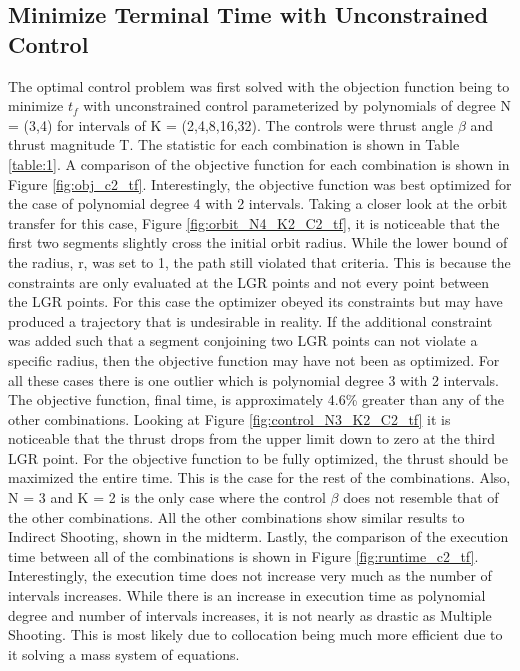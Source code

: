 \documentclass[]{article}
\begin{document}
    \subsection{Minimize Terminal Time with Unconstrained Control}
	 The optimal control problem was first solved with the objection function being to minimize \(t_f\) with unconstrained control parameterized by polynomials of degree N = (3,4) for intervals of K = (2,4,8,16,32). The controls were thrust angle \(\beta\) and thrust magnitude T. The statistic for each combination is shown in Table \ref{table:1}. A comparison of the objective function for each combination is shown in Figure \ref{fig:obj_c2_tf}. Interestingly, the objective function was best optimized for the case of polynomial degree 4 with 2 intervals. Taking a closer look at the orbit transfer for this case, Figure \ref{fig:orbit_N4_K2_C2_tf}, it is noticeable that the first two segments slightly cross the initial orbit radius. While the lower bound of the radius, r, was set to 1, the path still violated that criteria. This is because the constraints are only evaluated at the LGR points and not every point between the LGR points. For this case the optimizer obeyed its constraints but may have produced a trajectory that is undesirable in reality. If the additional constraint was added such that a segment conjoining two LGR points can not violate a specific radius, then the objective function may have not been as optimized. For all these cases there is one outlier which is polynomial degree 3 with 2 intervals. The objective function, final time, is approximately 4.6\% greater than any of the other combinations. Looking at Figure \ref{fig:control_N3_K2_C2_tf} it is noticeable that the thrust drops from the upper limit down to zero at the third LGR point. For the objective function to be fully optimized, the thrust should be maximized the entire time. This is the case for the rest of the combinations. Also, N = 3 and K = 2 is the only case where the control \(\beta\) does not resemble that of the other combinations. All the other combinations show similar results to Indirect Shooting, shown in the midterm. Lastly, the comparison of the execution time between all of the combinations is shown in Figure \ref{fig:runtime_c2_tf}. Interestingly, the execution time does not increase very much as the number of intervals increases. While there is an increase in execution time as polynomial degree and number of intervals increases, it is not nearly as drastic as Multiple Shooting. This is most likely due to collocation being much more efficient due to it solving a mass system of equations.
\end{document}
